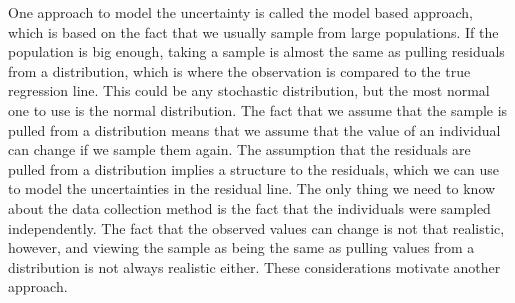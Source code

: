 \documentclass{article}
\begin{document}
One approach to model the uncertainty is called the model based approach, which
is based on the fact that we usually sample from large populations. If the
population is big enough, taking a sample is almost the same as pulling
residuals from a distribution, which is where the observation is compared to the
true regression line. This could be any stochastic distribution, but the most
normal one to use is the normal distribution. The fact that we assume that the
sample is pulled from a distribution means that we assume that the value of an
individual can change if we sample them again. The assumption that the residuals
are pulled from a distribution implies a structure to the residuals, which we
can use to model the uncertainties in the residual line. The only thing we need
to know about the data collection method is the fact that the individuals were
sampled independently. The fact that the observed values can change is not that
realistic, however, and viewing the sample as being the same as pulling values
from a distribution is not always realistic either. These considerations
motivate another approach.

\end{document}
